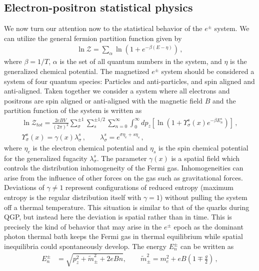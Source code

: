 \documentclass[universe,article,submit,moreauthors,pdftex,a4paper]{Definitions/mdpi}
\begin{document}
\subsection{Electron-positron statistical physics}\label{sec:Partition}
\noindent We now turn our attention now to the statistical behavior of the $e^{\pm}$ system. We can utilize the general fermion partition function given by \cite{Elze:1980er}
\begin{align}
  \label{PartFunc} \ln\mathcal{Z}=\sum_{\alpha}\ln\left(1+e^{-\beta(E-\eta)}\right)\,,
\end{align}
where $\beta=1/T$, $\alpha$ is the set of all quantum numbers in the system, and $\eta$ is the generalized chemical potential. The magnetized $e^{\pm}$ system should be considered a system of four quantum species: Particles and anti-particles, and spin aligned and anti-aligned. Taken together we consider a system where all electrons and positrons are spin aligned or anti-aligned with the magnetic field $B$ and the partition function of the system is written as
\begin{align}
  \label{PartFuncB}\ln\mathcal{Z}_{tot}=\frac{2eBV}{(2\pi)^2}\sum_{\sigma}^{\pm1}\sum_{s}^{\pm1/2}\sum_{n=0}^\infty\int^\infty_{0}dp_z\left[\ln\left(1+\Upsilon_{\sigma}^{s}(x)e^{-\beta E_{n}^{s}}\right)\right]\,,\\
  \label{Fugacity}\Upsilon_{\sigma}^{s}(x)=\gamma(x)\lambda_{\sigma}^{s}\,,\qquad\lambda_{\sigma}^{s}=e^{\sigma\eta_{e}+s\eta_{s}}\,,
\end{align}
where $\eta_{e}$ is the electron chemical potential and $\eta_s$ is the spin chemical potential for the generalized fugacity $\lambda_{\sigma}^{s}$. The parameter $\gamma(x)$ is a spatial field which controls the distribution inhomogeneity of the Fermi gas. Inhomogeneities can arise from the influence of other forces on the gas such as gravitational forces. Deviations of $\gamma\neq1$ represent configurations of reduced entropy (maximum entropy is the regular distribution itself with $\gamma=1$) without pulling the system off a thermal temperature. This situation is similar to that of the quarks during QGP, but instead here the deviation is spatial rather than in time. This is precisely the kind of behavior that may arise in the $e^{\pm}$ epoch as the dominant photon thermal bath keeps the Fermi gas in thermal equilibrium while spatial inequilibria could spontaneously develop. The energy $E_{n}^\pm$ can be written as
\begin{align}
E_{n}^\pm&=\sqrt{p^2_z+\tilde m^2_\pm+2eBn},\qquad\tilde{m}^2_\pm=m^2_e+eB\left(1\mp\frac{g}{2}\right)\,,
\end{align}
\end{document}
